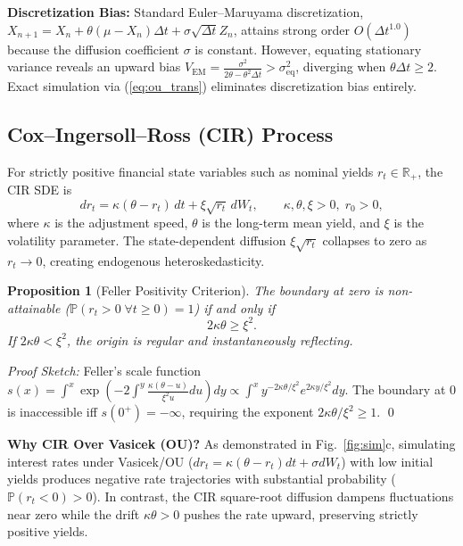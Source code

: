 \documentclass[10pt,twocolumn]{article}
\newtheorem{proposition}{Proposition}
\begin{document}
\textbf{Discretization Bias:} Standard Euler--Maruyama discretization, $X_{n+1} = X_n + \theta(\mu - X_n)\Delta t + \sigma\sqrt{\Delta t}Z_n$, attains strong order $O(\Delta t^{1.0})$ because the diffusion coefficient $\sigma$ is constant. However, equating stationary variance reveals an upward bias $V_{\mathrm{EM}} = \frac{\sigma^2}{2\theta - \theta^2\Delta t} > \sigma_{\mathrm{eq}}^2$, diverging when $\theta\Delta t \ge 2$. Exact simulation via (\ref{eq:ou_trans}) eliminates discretization bias entirely.

\subsection{Cox--Ingersoll--Ross (CIR) Process}
For strictly positive financial state variables such as nominal yields $r_t \in \mathbb{R}_+$, the CIR SDE is
\begin{equation}
dr_t = \kappa(\theta - r_t)\,dt + \xi\sqrt{r_t}\,dW_t, \qquad \kappa, \theta, \xi > 0,\; r_0 > 0,
\label{eq:cir_sde}
\end{equation}
where $\kappa$ is the adjustment speed, $\theta$ is the long-term mean yield, and $\xi$ is the volatility parameter. The state-dependent diffusion $\xi\sqrt{r_t}$ collapses to zero as $r_t \to 0$, creating endogenous heteroskedasticity.

\begin{proposition}[Feller Positivity Criterion]
The boundary at zero is non-attainable ($\mathbb{P}(r_t > 0 \; \forall t \ge 0) = 1$) if and only if
\begin{equation}
2\kappa\theta \ge \xi^2.
\label{eq:feller}
\end{equation}
If $2\kappa\theta < \xi^2$, the origin is regular and instantaneously reflecting.
\end{proposition}
\noindent\textit{Proof Sketch:} Feller's scale function $s(x) = \int^x \exp\!\left(-2\int^y \frac{\kappa(\theta-u)}{\xi^2 u}du\right)dy \propto \int^x y^{-2\kappa\theta/\xi^2}e^{2\kappa y/\xi^2}dy$. The boundary at $0$ is inaccessible iff $s(0^+) = -\infty$, requiring the exponent $2\kappa\theta/\xi^2 \ge 1$. \qed

\textbf{Why CIR Over Vasicek (OU)?} As demonstrated in Fig.~\ref{fig:sim}c, simulating interest rates under Vasicek/OU ($dr_t = \kappa(\theta-r_t)dt + \sigma dW_t$) with low initial yields produces negative rate trajectories with substantial probability ($\mathbb{P}(r_t < 0) > 0$). In contrast, the CIR square-root diffusion dampens fluctuations near zero while the drift $\kappa\theta > 0$ pushes the rate upward, preserving strictly positive yields.
\end{document}
